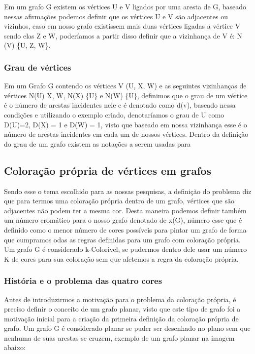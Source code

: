 \documentclass[12pt]{article}
\begin{document}
   	Em um grafo G existem os vértices U e V ligados por uma aresta de G, baseado nessas afirmações podemos definir que os vértices U e V são adjacentes ou vizinhos, caso em nosso grafo existissem mais duas vértices ligadas a vértice V sendo elas Z e W, poderíamos a partir disso definir que a vizinhança de V é: N (V) \{U, Z, W\}. 
   	
   	\subsubsection{Grau de vértices}
    Em um Grafo G contendo os vértices V (U, X, W) e as seguintes vizinhanças de vértices N(U) {X, W}, N(X) \{U\} e N(W) \{U\}, definimos que o grau de um vértice é o número de arestas incidentes nele e é denotado como d(v), baseado nessa condições e utilizando o exemplo criado, denotaríamos o grau de U como D(U)=2, D(X) = 1 e D(W) = 1, visto que baseado em nossa vizinhança esse é o número de arestas incidentes em cada um de nossos vértices.
    Dentro da definição do grau de um grafo existem as notações a serem usadas para 
    
    \subsection{ Coloração própria de vértices em grafos}
    Sendo esse o tema escolhido para as nossas pesquisas, a definição do problema diz que para termos uma coloração própria dentro de um grafo, vértices que são adjacentes não podem ter a mesma cor. Desta maneira podemos definir também um número cromático para o nosso grafo denotado de x(G), número esse que é definido como o menor número de cores possíveis para pintar um grafo de forma que cumpramos odas as regras definidas para um grafo com coloração própria.
    Um grafo G é considerado k-Colorivel, se pudermos dentro dele usar um número K de cores para sua coloração sem que afetemos a regra da coloração própria.
    
    \subsubsection{História e o problema das quatro cores}
    
    Antes de introduzirmos a motivação para o problema da coloração própria, é preciso definir o conceito de um grafo planar, visto que este tipo de grafo foi a motivação inicial para a criação da primeira definição da coloração própria de grafo.
    Um grafo G é considerado planar se puder ser desenhado no plano sem que nenhuma de suas arestas se cruzem, exemplo de um grafo planar na imagem abaixo:
    
\end{document}
